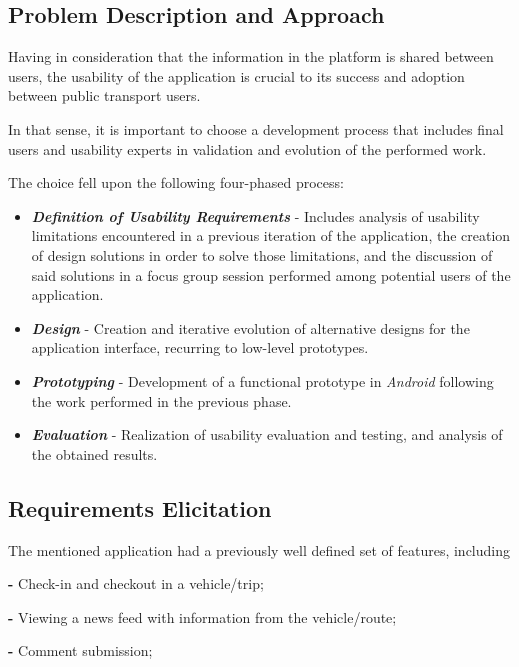 \documentclass[9pt,a4paper]{extarticle}
\begin{document}
\begin{multicols}{2}
\section{Problem Description and Approach}\label{sec:work}

Having in consideration that the information in the platform is shared between users, the usability of the application is crucial to its success and adoption between public transport users.

In that sense, it is important to choose a development process that includes final users and usability experts in validation and evolution of the performed work.

The choice fell upon the following four-phased process:
\begin{itemize}
\item \textbf{\emph{Definition of Usability Requirements}} - Includes
analysis of usability limitations encountered in a previous iteration of the application, the creation of design solutions in order to solve those limitations, and the discussion of said solutions in a focus group session performed among potential users of the application.

\item \textbf{\emph{Design}} - Creation and iterative evolution of alternative designs for the application interface, recurring to low-level prototypes.

\item \textbf{\emph{Prototyping}} - Development of a functional prototype in \emph{Android} following the work performed in the previous phase.

\item \textbf{\emph{Evaluation}} - Realization of usability evaluation and testing, and analysis of the obtained results.
\end{itemize}


\subsection{Requirements Elicitation}\label{sec:req}

The mentioned application had a previously well defined set of features, including

\textbf{-} Check-in and checkout in a vehicle/trip;

\textbf{-} Viewing a news feed with information from the vehicle/route;

\textbf{-} Comment submission;


\end{multicols}
\end{document}
